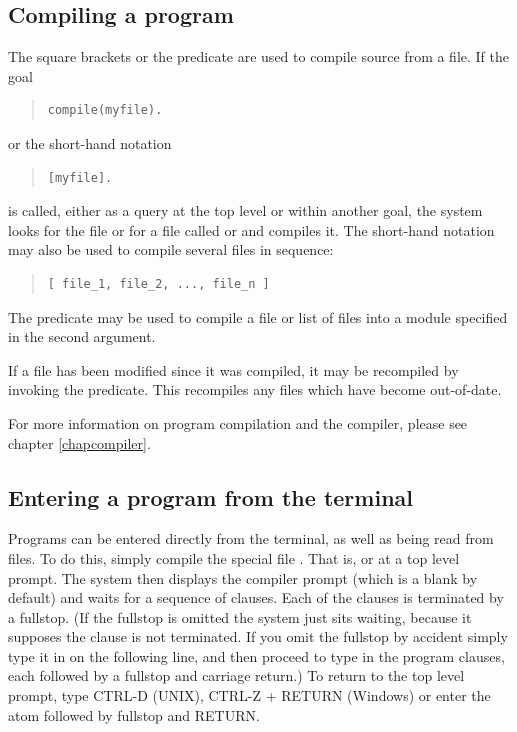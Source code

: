 \subsection{Compiling a program}

The square brackets \notation{[}\notation{]} or the
 predicate are used
to compile {\eclipse} source from a file.
If the goal
\begin{quote}
\begin{verbatim}
compile(myfile).
\end{verbatim}
\end{quote}
or the short-hand notation
\begin{quote}
\begin{verbatim}
[myfile].
\end{verbatim}
\end{quote}
is called, either as a query at the top level or within another goal,
the system looks for the file  or for a file called
 or  and compiles it.
The short-hand notation may also be used to compile several files in
sequence:
\begin{quote}
\begin{verbatim}
[ file_1, file_2, ..., file_n ]
\end{verbatim}
\end{quote}
The  predicate may be
used to compile a file or list of
files into a module specified in the second argument.

If a file has been modified since it was compiled, it may be recompiled by
invoking the  predicate.
This recompiles any files which have become out-of-date.

For more information on program compilation and the compiler, please see
chapter \ref{chapcompiler}.

\subsection{Entering a program from the terminal}

Programs can be entered directly from the terminal, as well as being read
from files.
To do this, simply compile the special file .
That is,  or  at a top level
prompt.
The system then displays the compiler prompt (which is a blank by default)
and waits for a sequence of clauses.
Each of the clauses is terminated by a fullstop.%
(If the fullstop is omitted the system just sits
waiting, because it supposes the clause is not terminated.
If you omit the fullstop by accident simply type it in on the following line,
and then proceed to type in the program clauses, each followed by a fullstop and
carriage return.)
To return to the top level prompt,
type CTRL-D (UNIX), CTRL-Z + RETURN (Windows) or enter the atom
 followed by fullstop and RETURN.

